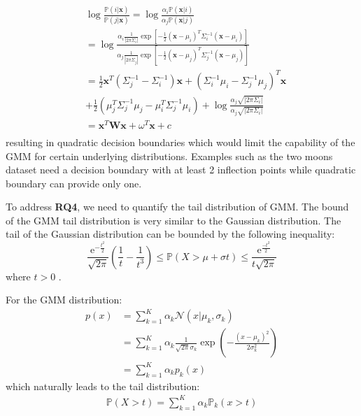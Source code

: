 \documentclass[10pt,journal,compsoc]{IEEEtran}
\newcommand{\Prob}{\mathbb{P}}
\newcommand{\Norm}{\mathcal{N}}
\newcommand{\x}{\mathbf{x}}
\begin{document}
    \begin{equation}
        \begin{aligned}
            &\log\frac{\Prob(i|\x)}{\Prob(j|\x)} = \log\frac{\alpha_i\Prob(\x|i)}{\alpha_j\Prob(\x|j)}\\
            &= \log \frac{\alpha_i \frac{1}{|2\pi\Sigma_i|}\exp\left[-\frac{1}{2}(\x-\mu_i)^T\Sigma_i^{-1}(\x-\mu_i)\right]}{\alpha_j \frac{1}{|2\pi\Sigma_j|}\exp\left[-\frac{1}{2}(\x-\mu_j)^T\Sigma_j^{-1}(\x-\mu_j)\right]}\\
            &= \frac{1}{2}\x^T(\Sigma_j^{-1}-\Sigma_i^{-1})\x
            + (\Sigma_i^{-1}\mu_i-\Sigma_j^{-1}\mu_j)^T\x \\
            & + \frac{1}{2}\left(\mu_j^T\Sigma_j^{-1}\mu_j-\mu_i^T\Sigma_j^{-1}\mu_i\right)+\log\frac{\alpha_j\sqrt{|2\pi\Sigma_i|}}{\alpha_j\sqrt{|2\pi\Sigma_i|}}\\
            &= \x^T\mathbf{W}\x + \omega^T\x + c\\
        \end{aligned}
    \end{equation}
    resulting in quadratic decision boundaries which would limit the capability of the GMM for certain underlying distributions. Examples such as the two moons dataset need a decision boundary with at least 2 inflection points while quadratic boundary can provide only one.
    
    
    To address \textbf{RQ4}, we need to quantify the tail distribution of GMM. The bound of the GMM tail distribution is very similar to the Gaussian distribution. The tail of the Gaussian distribution can be bounded by the following inequality\cite{feller2008introduction}:
    \begin{equation}
    \frac{\mathrm{e}^{-\frac{t^2}{2}}}{\sqrt{2\pi}}\left(\frac{1}{t} - \frac{1}{t^3} \right) \leq \Prob(X > \mu +\sigma t) \leq \frac{\mathrm{e}^{\frac{-t^2}{2}}}{t \sqrt{2\pi}}\label{con:bound}
    \end{equation}
    where $ t>0 $ .
    
    For the GMM distribution:
    \begin{equation}
    \begin{aligned}
    p(x) &= \sum_{k = 1}^K \alpha_k \Norm(x | \mu_k, \sigma_k)\\
    &= \sum_{k = 1}^K \alpha_k \frac{1}{\sqrt{2\pi}\sigma_k}\exp\left(-\frac{(x - \mu_k)^2}{2\sigma_k^2} \right)\\
   &= \sum_{k=1}^K \alpha_k p_k(x)
   \end{aligned}
   \end{equation}
   which naturally leads to the tail distribution:
  \begin{equation}
    \begin{aligned}
   \Prob(X>t) = \sum_{k=1}^K \alpha_k \Prob_k(x > t)
   \end{aligned}
   \end{equation}
    
\end{document}
